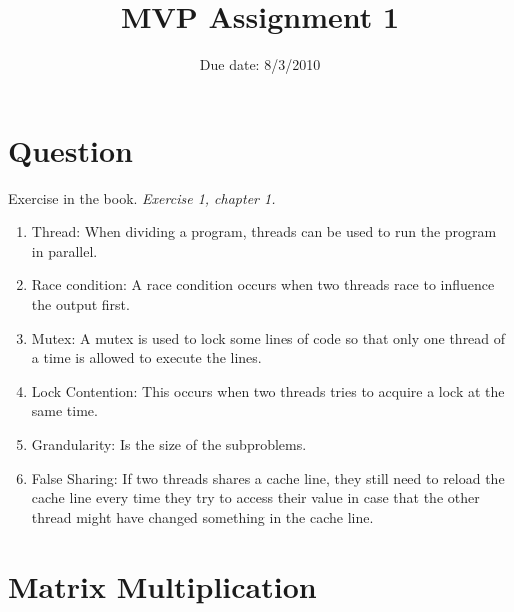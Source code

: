 \documentclass{article}
\title{MVP Assignment 1}
\date{Due date: 8/3/2010}
\begin{document}
\maketitle

\newcommand{\question}[1]{#1}
\newcommand{\answer}[1]{}


%
%
\answer{
\begin{flushleft}
{\bf Group room:} FIXME\\
{\bf Group number:} FIXME
\end{flushleft}
}

\section{Question}

\begin{ExerciseList}
\Exercise Exercise in the book.
\Question \emph{Exercise 1, chapter 1.}
\Answer
\begin{enumerate}
	\item Thread: When dividing a program, threads can be used to run the program in parallel.
	\item Race condition: A race condition occurs when two threads race to influence the output first. 
	\item Mutex: A mutex is used to lock some lines of code so that only one thread of a time is allowed to execute the lines.
	\item Lock Contention: This occurs when two threads tries to acquire a lock at the same time.
	\item Grandularity: Is the size of the subproblems.
	\item False Sharing: If two threads shares a cache line, they still need to reload the cache line every time they try to access their value in case that 
	the other thread might have changed something in the cache line.
\end{enumerate}

\end{ExerciseList}

\section{Matrix Multiplication}
\end{document}
